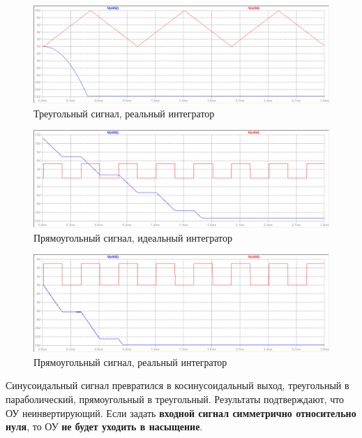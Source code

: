 \documentclass[a4paper, 12pt]{article}
\begin{document}
    \begin{figure}[H]
        \centering
        \includegraphics[scale=0.46]{3task_real_triangle.png}
        \captionsetup{skip=0pt}
        \caption{Треугольный сигнал, реальный интегратор}
        \label{fig:3task_real_triangle}
    \end{figure}
    \begin{figure}[H]
        \centering
        \includegraphics[scale=0.46]{3task_ideal_rect.png}
        \captionsetup{skip=0pt}
        \caption{Прямоугольный сигнал, идеальный интегратор}
        \label{fig:3task_ideal_rect}
    \end{figure}
    \begin{figure}[H]
        \centering
        \includegraphics[scale=0.46]{3task_real_rect.png}
        \captionsetup{skip=0pt}
        \caption{Прямоугольный сигнал, реальный интегратор}
        \label{fig:3task_real_rect}
    \end{figure}
    \noindent Синусоидальный сигнал превратился в косинусоидальный выход, треугольный в параболический,
    прямоугольный в треугольный. Результаты подтверждают, что ОУ неинвертирующий. Если задать \textbf{входной
    сигнал симметрично относительно нуля}, то ОУ \textbf{не будет уходить в насыщение}.
\end{document}
